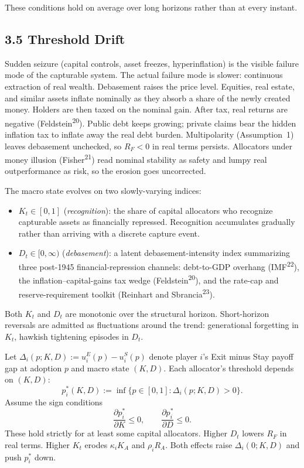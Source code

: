 \documentclass[12pt]{article}
\theoremstyle{definition}
\theoremstyle{remark}
\begin{document}
\smallskip
\noindent These conditions hold on average over long
horizons rather than at every instant.

\subsection{3.5 Threshold Drift}

Sudden seizure (capital controls, asset freezes, hyperinflation) is the visible failure mode of the capturable system. The actual failure mode is slower: continuous extraction of real wealth. Debasement raises the price level. Equities, real estate, and similar assets inflate nominally as they absorb a share of the newly created money. Holders are then taxed on the nominal gain. After tax, real returns are negative (Feldstein\textsuperscript{20}). Public debt keeps growing; private claims bear the hidden inflation tax to inflate away the real debt burden. Multipolarity (Assumption~1) leaves debasement unchecked, so $R_F < 0$ in real terms persists. Allocators under money illusion (Fisher\textsuperscript{21}) read nominal stability as safety and lumpy real outperformance as risk, so the erosion goes uncorrected.

The macro state evolves on two slowly-varying indices:
\begin{itemize}[nosep,leftmargin=*]
\item $K_t \in [0,1]$ (\emph{recognition}): the share of capital allocators who recognize capturable assets as financially repressed. Recognition accumulates gradually rather than arriving with a discrete capture event.
\item $D_t \in [0, \infty)$ (\emph{debasement}): a latent debasement-intensity index summarizing three post-1945 financial-repression channels: debt-to-GDP overhang (IMF\textsuperscript{22}), the inflation--capital-gains tax wedge (Feldstein\textsuperscript{20}), and the rate-cap and reserve-requirement toolkit (Reinhart and Sbrancia\textsuperscript{23}).
\end{itemize}
Both $K_t$ and $D_t$ are monotonic over the structural horizon. Short-horizon reversals are admitted as fluctuations around the trend: generational forgetting in $K_t$, hawkish tightening episodes in $D_t$.

Let $\Delta_i(p; K, D) := u_i^E(p) - u_i^S(p)$ denote player $i$'s Exit minus Stay payoff gap at adoption $p$ and macro state $(K, D)$. Each allocator's threshold depends on $(K, D)$:
\[
p_i^*(K, D) := \inf\{p \in [0, 1] : \Delta_i(p; K, D) > 0\}.
\]
Assume the sign conditions
\[
\frac{\partial p_i^*}{\partial K} \leq 0, \qquad
\frac{\partial p_i^*}{\partial D} \leq 0.
\]
These hold strictly for at least some capital allocators.
Higher $D_t$ lowers $R_F$ in real terms. Higher $K_t$ erodes
$\kappa_i K_A$ and $\rho_i R_A$. Both effects raise
$\Delta_i(0; K, D)$ and push $p_i^*$ down.
\end{document}
